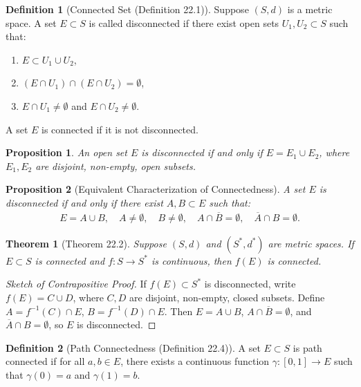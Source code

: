 \documentclass[7pt]{article}
\theoremstyle{definition}
\newtheorem{definition}{Definition}
\theoremstyle{plain}
\newtheorem{theorem}{Theorem}
\newtheorem{proposition}{Proposition}
\begin{document}
\begin{definition}[Connected Set (Definition 22.1)]
Suppose $ (S, d) $ is a metric space. A set $ E \subset S $ is called disconnected if there exist open sets $ U_1, U_2 \subset S $ such that:
\begin{enumerate}
    \item $ E \subset U_1 \cup U_2 $,
    \item $ (E \cap U_1) \cap (E \cap U_2) = \emptyset $,
    \item $ E \cap U_1 \neq \emptyset $ and $ E \cap U_2 \neq \emptyset $.
\end{enumerate}
A set $ E $ is connected if it is not disconnected.
\end{definition}

\begin{proposition}
An open set $ E $ is disconnected if and only if $ E = E_1 \cup E_2 $, where $ E_1, E_2 $ are disjoint, non-empty, open subsets.
\end{proposition}

\begin{proposition}[Equivalent Characterization of Connectedness]
A set $ E $ is disconnected if and only if there exist $ A, B \subset E $ such that:
\begin{align}
E = A \cup B, \quad A \neq \emptyset, \quad B \neq \emptyset, \quad A \cap \overline{B} = \emptyset, \quad \overline{A} \cap B = \emptyset.
\end{align}
\end{proposition}

\begin{theorem}[Theorem 22.2]
Suppose $ (S, d) $ and $ (S^*, d^*) $ are metric spaces. If $ E \subset S $ is connected and $ f : S \to S^* $ is continuous, then $ f(E) $ is connected.
\end{theorem}

\begin{proof}[Sketch of Contrapositive Proof]
If $ f(E) \subset S^* $ is disconnected, write $ f(E) = C \cup D $, where $ C, D $ are disjoint, non-empty, closed subsets. Define $ A = f^{-1}(C) \cap E $, $ B = f^{-1}(D) \cap E $. Then $ E = A \cup B $, $ A \cap \overline{B} = \emptyset $, and $ \overline{A} \cap B = \emptyset $, so $ E $ is disconnected.
\end{proof}

\begin{definition}[Path Connectedness (Definition 22.4)]
A set $ E \subset S $ is path connected if for all $ a, b \in E $, there exists a continuous function $ \gamma : [0, 1] \to E $ such that $ \gamma(0) = a $ and $ \gamma(1) = b $.
\end{definition}
\end{document}
